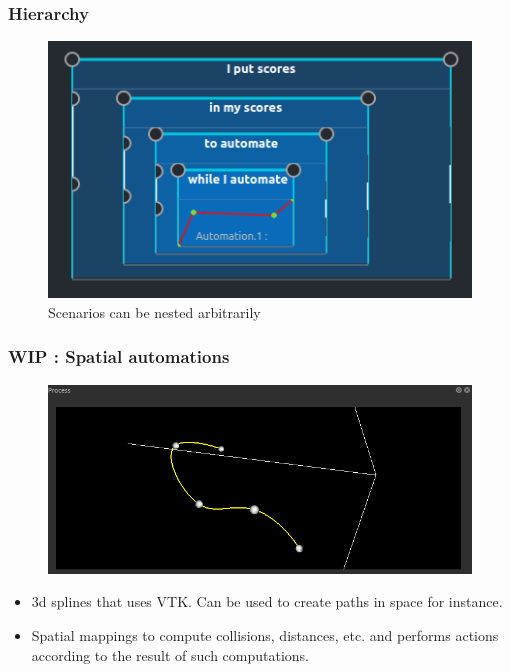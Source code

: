\documentclass{beamer}
\begin{document}
    \begin{frame}
        \frametitle{Hierarchy}
        
        \begin{figure}
        	\centering
        	\includegraphics[scale=0.6]{images/hierarchy.png}
        	\caption{Scenarios can be nested arbitrarily}
        \end{figure}   
    \end{frame}
    
    \begin{frame}
        \frametitle{WIP : Spatial automations}
        
        \begin{figure}
        	\centering
        	\includegraphics[width=\textwidth]{images/autom3d.png}
        \end{figure}   
        
        \begin{itemize}
        	\item 3d splines that uses VTK. Can be used to create paths in space for instance.
        	\item Spatial mappings to compute collisions, distances, etc. and performs actions according to the result of such computations.
        \end{itemize}
    \end{frame}
    
\end{document}
